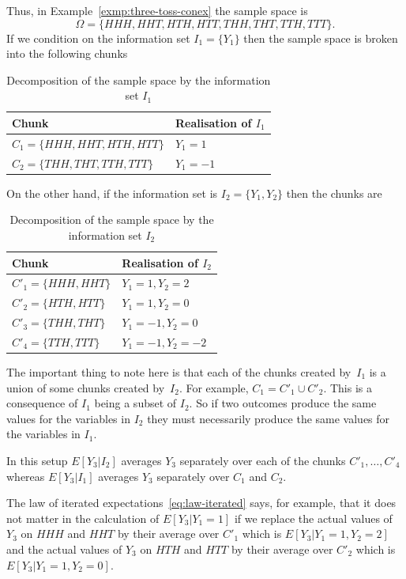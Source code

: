 \documentclass[12pt,reqno,openany]{amsbook}
\theoremstyle{plain}
\theoremstyle{definition}
\begin{document}
Thus, in Example~\ref{exmp:three-toss-conex} the sample space is
\[\Omega=\{HHH,HHT,HTH,HTT,THH,THT,TTH,TTT\}.\]
If we condition on the information set $I_1=\{Y_1\}$ then the sample
space is broken into the following chunks

\begin{table}[h]
\begin{tabular}{ll}
\hline
Chunk&Realisation of $I_1$\\
\hline
$C_1=\{HHH,HHT,HTH,HTT\}$&$Y_1=1$\\
$C_2=\{THH,THT,TTH,TTT\}$&$Y_1=-1$\\
\hline
\end{tabular}
\caption{Decomposition of the sample space by the information set $I_1$}\label{tab:decomp_I1}
\end{table}

On the other hand, if the information set is $I_2 = \{Y_1,Y_2\}$ then
the chunks are
\begin{table}[h]
\begin{tabular}{ll}
\hline
Chunk&Realisation of $I_2$\\
\hline
$C'_1=\{HHH,HHT\}$&$Y_1=1,Y_2=2$\\
$C'_2=\{HTH,HTT\}$&$Y_1=1,Y_2=0$\\
$C'_3=\{THH,THT\}$&$Y_1=-1,Y_2=0$\\
$C'_4=\{TTH,TTT\}$&$Y_1=-1,Y_2=-2$\\
\hline
\end{tabular}
\caption{Decomposition of the sample space by the information set $I_2$}\label{tab:decomp_I2}
\end{table}

The important thing to note here is that each of the chunks created
by~$I_1$ is a union of some chunks created by~$I_2$. For example,
$C_1=C'_1 \cup C'_2$. This is a consequence of $I_1$ being a subset of
$I_2$. So if two outcomes produce the same values for the variables in
$I_2$ they must necessarily produce the same values for the variables
in $I_1$.

In this setup $E[Y_3|I_2]$ averages $Y_3$ separately over each of the
chunks $C'_1,\ldots,C'_4$ whereas $E[Y_3|I_1]$ averages $Y_3$
separately over $C_1$ and $C_2$. 

The law of iterated expectations~\eqref{eq:law-iterated} says, for example, that it
does not matter in the calculation of $E[Y_3|Y_1=1]$ if we replace the
actual values of $Y_3$ on $HHH$ and $HHT$ by their average over $C'_1$
which is $E[Y_3|Y_1=1,Y_2=2]$ and the actual values of $Y_3$ on $HTH$ and
$HTT$ by their average over $C'_2$ which is $E[Y_3|Y_1=1,Y_2=0]$.
\end{document}
